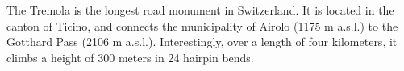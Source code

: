 The Tremola is the longest road monument in Switzerland.
It is located in the canton of Ticino, and connects the municipality of Airolo (1175 m a.s.l.) to the Gotthard Pass (2106 m a.s.l.).
Interestingly, over a length of four kilometers, it climbs a height of 300 meters in 24 hairpin bends.